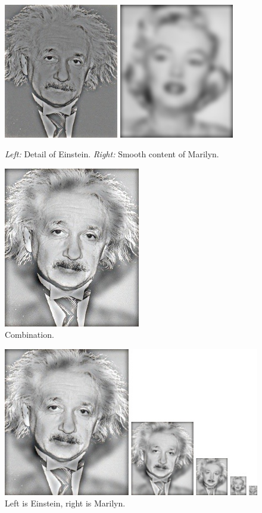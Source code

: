 \begin{figure}[h]
    \centering
    \includegraphics[width=5cm]{high_frequencies.jpg}
    \includegraphics[width=5cm]{low_frequencies.jpg}
    \caption{\emph{Left:} Detail of Einstein. \emph{Right:} Smooth content of Marilyn.}
    \label{fig:result1}
\end{figure}

\begin{figure}
	\centering
	\includegraphics[width=0.5\linewidth]{hybrid_image}
	\caption{Combination.}
	\label{fig:hybridimage}
\end{figure}

\begin{figure}
	\centering
	\includegraphics[width=0.9\linewidth]{hybrid_image_scales}
	\caption{Left is Einstein, right is Marilyn.}
	\label{fig:hybridimagescales}
\end{figure}





